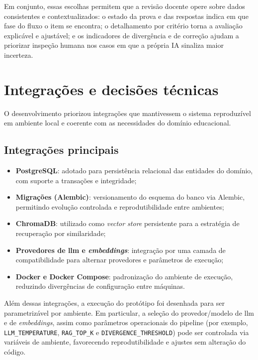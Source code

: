 Em conjunto, essas escolhas permitem que a revisão docente opere sobre dados consistentes e contextualizados: o estado da prova e das respostas indica em que fase do fluxo o item se encontra; o detalhamento por critério torna a avaliação explicável e ajustável; e os indicadores de divergência e de correção ajudam a priorizar inspeção humana nos casos em que a própria IA sinaliza maior incerteza.

\section{Integrações e decisões técnicas}

O desenvolvimento priorizou integrações que mantivessem o sistema reproduzível em ambiente local e coerente com as necessidades do domínio educacional.

\subsection{Integrações principais}

\begin{itemize}
    \item \textbf{PostgreSQL}: adotado para persistência relacional das entidades do domínio, com suporte a transações e integridade;
    \item \textbf{Migrações (Alembic)}: versionamento do esquema do banco via Alembic, permitindo evolução controlada e reprodutibilidade entre ambientes;
    \item \textbf{ChromaDB}: utilizado como \textit{vector store} persistente para a estratégia de recuperação por similaridade;
    \item \textbf{Provedores de \gls{llm} e \textit{embeddings}}: integração por uma camada de compatibilidade para alternar provedores e parâmetros de execução;
    \item \textbf{Docker e Docker Compose}: padronização do ambiente de execução, reduzindo divergências de configuração entre máquinas.
\end{itemize}

Além dessas integrações, a execução do protótipo foi desenhada para ser parametrizável por ambiente. Em particular, a seleção do provedor/modelo de \gls{llm} e de \textit{embeddings}, assim como parâmetros operacionais do pipeline (por exemplo, \texttt{LLM\_TEMPERATURE}, \texttt{RAG\_TOP\_K} e \texttt{DIVERGENCE\_THRESHOLD}) pode ser controlada via variáveis de ambiente, favorecendo reprodutibilidade e ajustes sem alteração do código.


